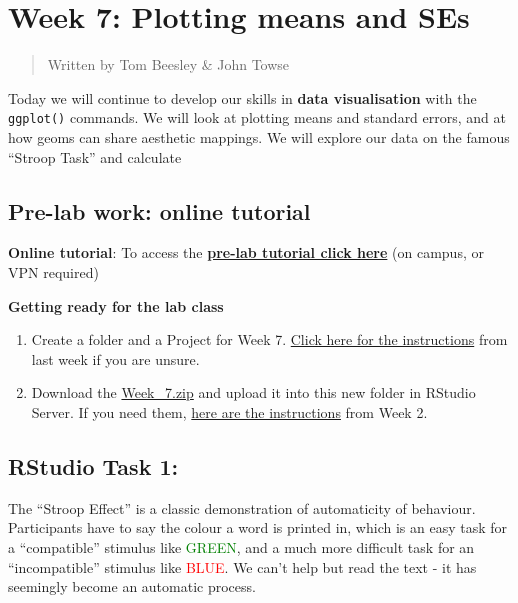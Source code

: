 \documentclass[
]{book}
\begin{document}
\hypertarget{week-7-plotting-means-and-ses}{%
\chapter{Week 7: Plotting means and SEs}\label{week-7-plotting-means-and-ses}}

\begin{quote}
Written by Tom Beesley \& John Towse
\end{quote}

Today we will continue to develop our skills in \textbf{data visualisation} with the \texttt{ggplot()} commands. We will look at plotting means and standard errors, and at how geoms can share aesthetic mappings. We will explore our data on the famous ``Stroop Task'' and calculate

\hypertarget{pre-lab-work-online-tutorial-2}{%
\section{Pre-lab work: online tutorial}\label{pre-lab-work-online-tutorial-2}}

\textbf{Online tutorial}: To access the \href{https://ma-rconnect.lancs.ac.uk/Week_7_LabPrep}{\textbf{pre-lab tutorial click here}} (on campus, or VPN required)

\textbf{Getting ready for the lab class}

\begin{enumerate}
\def\labelenumi{\arabic{enumi}.}
\item
  Create a folder and a Project for Week 7. \protect\hyperlink{creating_project}{Click here for the instructions} from last week if you are unsure.
\item
  Download the \href{files/Week_7/Week_7.zip}{Week\_7.zip} and upload it into this new folder in RStudio Server. If you need them, \protect\hyperlink{uploading_zip}{here are the instructions} from Week 2.
\end{enumerate}

\hypertarget{rstudio-task-1}{%
\section{RStudio Task 1:}\label{rstudio-task-1}}

The ``Stroop Effect'' is a classic demonstration of automaticity of behaviour. Participants have to say the colour a word is printed in, which is an easy task for a ``compatible'' stimulus like \textcolor{green}{GREEN}, and a much more difficult task for an ``incompatible'' stimulus like \textcolor{red}{BLUE}. We can't help but read the text - it has seemingly become an automatic process.
\end{document}
